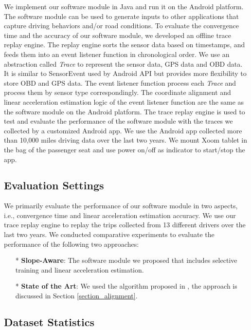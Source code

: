 
We implement our software module in Java and run it on the Android platform.
The software module can be used to generate 
inputs to other applications that capture
driving behaviors and/or road conditions.
To evaluate the convergence time and the accuracy of our 
software module, we developed an offline trace replay engine.
The replay engine sorts the sensor data
based on timestamps, and feeds them into an event listener function in chronological order. 
We use an abstraction called \emph{Trace} to represent the sensor data, 
GPS data and OBD data.
It is similar to SensorEvent used by Android API \cite{sensor}
but provides more flexibility to store OBD and GPS data. 
The event listener function process each \emph{Trace} 
and process them by sensor type correspondingly. 
The coordinate alignment and linear acceleration estimation logic of
the event listener function are the same
as the software module on the Android platform.
The trace replay engine is used to test and evaluate 
the performance of the software module with the traces we collected
by a customized Android app.  
We use the Android app collected more than 10,000 miles
driving data over the last two years. 
We mount Xoom tablet in the bag of the passenger seat and 
use power on/off as indicator to start/stop the app. 


\subsection{Evaluation Settings}

We primarily evaluate the performance of our software module in two aspects, 
i.e., convergence time and linear acceleration estimation accuracy.
We use our trace replay engine to replay the trips collected 
from 13 different drivers over the last two years.
We conducted comparative experiments to evaluate the performance
of the following two approaches:
\begin{itemize}
\item[*]
\textbf{Slope-Aware}: The software module we proposed that includes selective training
and linear acceleration estimation. 
\item[*] \textbf{State of the Art}:
We used the algorithm proposed in \cite{wang2013sensing}, 
the approach is discussed in Section \ref{section_alignment}. 

\end{itemize}


\subsection{Dataset Statistics}

